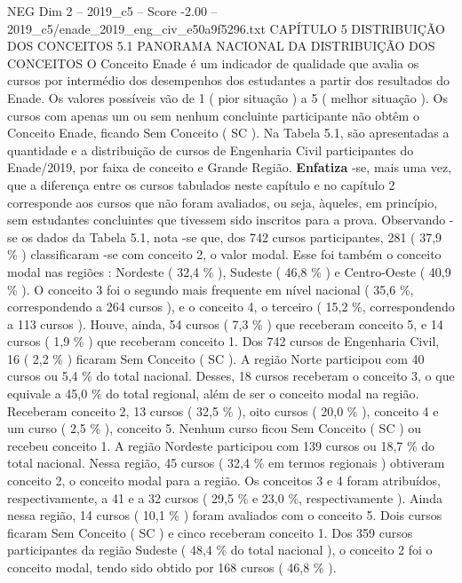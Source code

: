 \begin{textsample}{NEG Dim 2 – 2019\_c5 – Score -2.00 – 2019\_c5/enade\_2019\_eng\_civ\_e50a9f5296.txt}  \label{ex:f2_neg_095}
CAPÍTULO 5 DISTRIBUIÇÃO DOS CONCEITOS 5.1 PANORAMA NACIONAL DA DISTRIBUIÇÃO DOS CONCEITOS O Conceito Enade é um indicador de qualidade que avalia os cursos por intermédio dos desempenhos dos estudantes a partir dos resultados do Enade.
Os valores possíveis vão de 1 ( pior situação ) a 5 ( melhor situação ).
Os cursos com apenas um ou sem nenhum concluinte participante não obtêm o Conceito Enade, ficando Sem Conceito ( SC ).
Na Tabela 5.1, são apresentadas a quantidade e a distribuição de cursos de Engenharia Civil participantes do Enade/2019, por faixa de conceito e Grande Região. \textbf{Enfatiza} -se, mais uma vez, que a diferença entre os cursos tabulados neste capítulo e no capítulo 2 corresponde aos cursos que não foram avaliados, ou seja, àqueles, em princípio, sem estudantes concluintes que tivessem sido inscritos para a prova.
Observando -se os dados da Tabela 5.1, nota -se que, dos 742 cursos participantes, 281 ( 37,9 \% ) classificaram -se com conceito 2, o valor modal.
Esse foi também o conceito modal nas regiões : Nordeste ( 32,4 \% ), Sudeste ( 46,8 \% ) e Centro-Oeste ( 40,9 \% ).
O conceito 3 foi o segundo mais frequente em nível nacional ( 35,6 \%, correspondendo a 264 cursos ), e o conceito 4, o terceiro ( 15,2 \%, correspondendo a 113 cursos ).
Houve, ainda, 54 cursos ( 7,3 \% ) que receberam conceito 5, e 14 cursos ( 1,9 \% ) que receberam conceito 1.
Dos 742 cursos de Engenharia Civil, 16 ( 2,2 \% ) ficaram Sem Conceito ( SC ).
A região Norte participou com 40 cursos ou 5,4 \% do total nacional.
Desses, 18 cursos receberam o conceito 3, o que equivale a 45,0 \% do total regional, além de ser o conceito modal na região.
Receberam conceito 2, 13 cursos ( 32,5 \% ), oito cursos ( 20,0 \% ), conceito 4 e um curso ( 2,5 \% ), conceito 5.
Nenhum curso ficou Sem Conceito ( SC ) ou recebeu conceito 1.
A região Nordeste participou com 139 cursos ou 18,7 \% do total nacional.
Nessa região, 45 cursos ( 32,4 \% em termos regionais ) obtiveram conceito 2, o conceito modal para a região.
Os conceitos 3 e 4 foram atribuídos, respectivamente, a 41 e a 32 cursos ( 29,5 \% e 23,0 \%, respectivamente ).
Ainda nessa região, 14 cursos ( 10,1 \% ) foram avaliados com o conceito 5.
Dois cursos ficaram Sem Conceito ( SC ) e cinco receberam conceito 1.
Dos 359 cursos participantes da região Sudeste ( 48,4 \% do total nacional ), o conceito 2 foi o conceito modal, tendo sido obtido por 168 cursos ( 46,8 \% ).

\end{textsample}
